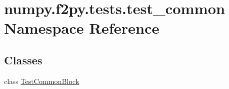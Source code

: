 \hypertarget{namespacenumpy_1_1f2py_1_1tests_1_1test__common}{}\section{numpy.\+f2py.\+tests.\+test\+\_\+common Namespace Reference}
\label{namespacenumpy_1_1f2py_1_1tests_1_1test__common}
\subsection*{Classes}
\begin{DoxyCompactItemize}
\item 
class \hyperlink{classnumpy_1_1f2py_1_1tests_1_1test__common_1_1TestCommonBlock}{Test\+Common\+Block}
\end{DoxyCompactItemize}
